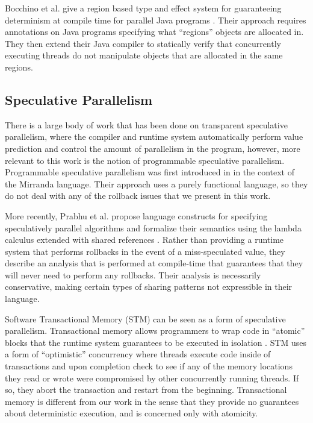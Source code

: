 Bocchino et al. give a region based type and effect system for guaranteeing determinism at compile time for parallel Java programs \cite{type-and-effect-dpj}.  Their approach requires annotations on Java programs specifying what ``regions'' objects are allocated in.  They then extend their Java compiler to statically verify that concurrently executing threads do not manipulate objects that are allocated in the same regions.  

\subsection{Speculative Parallelism}

There is a large body of work that has been done on transparent speculative parallelism, where the compiler and runtime system automatically perform value prediction and control the amount of parallelism in the program, however, more relevant to this work is the notion of programmable speculative parallelism.  Programmable speculative parallelism was first introduced in \cite{burton-spec-par} in the context of the Mirranda language.  Their approach uses a purely functional language, so they do not deal with any of the rollback issues that we present in this work. 

More recently, Prabhu et al. propose language constructs for specifying speculatively parallel algorithms and formalize their semantics using the lambda calculus extended with shared references \cite{programmable-spec-par}.  Rather than providing a runtime system that performs rollbacks in the event of a miss-speculated value, they describe an analysis that is performed at compile-time that guarantees that they will never need to perform any rollbacks.  Their analysis is necessarily conservative, making certain types of sharing patterns not expressible in their language. 

Software Transactional Memory (STM) can be seen as a form of speculative parallelism.  Transactional memory allows programmers to wrap code in ``atomic'' blocks that the runtime system guarantees to be executed in isolation \cite{stm}.  STM uses a form of ``optimistic'' concurrency where threads execute code inside of transactions and upon completion check to see if any of the memory locations they read or wrote were compromised by other concurrently running threads.  If so, they abort the transaction and restart from the beginning.  Transactional memory is different from our work in the sense that they provide no guarantees about deterministic execution, and is concerned only with atomicity. 




